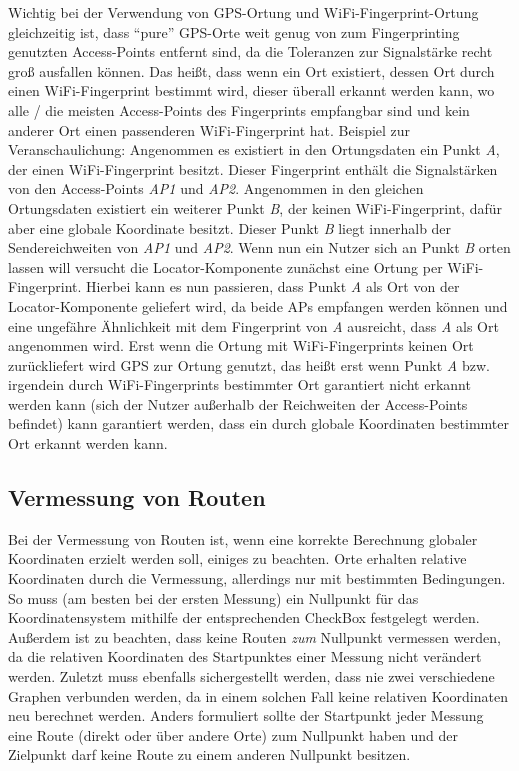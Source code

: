 Wichtig bei der Verwendung von GPS-Ortung und WiFi-Fingerprint-Ortung gleichzeitig ist, dass \enquote{pure} GPS-Orte weit genug von zum Fingerprinting genutzten Access-Points entfernt sind, da die Toleranzen zur Signalstärke recht groß ausfallen können. Das heißt, dass wenn ein Ort existiert, dessen Ort durch einen WiFi-Fingerprint bestimmt wird, dieser überall erkannt werden kann, wo alle / die meisten Access-Points des Fingerprints empfangbar sind und kein anderer Ort einen passenderen WiFi-Fingerprint hat. Beispiel zur Veranschaulichung: Angenommen es existiert in den Ortungsdaten ein Punkt \textit{A}, der einen WiFi-Fingerprint besitzt. Dieser Fingerprint enthält die Signalstärken von den Access-Points \textit{AP1} und \textit{AP2}. Angenommen in den gleichen Ortungsdaten existiert ein weiterer Punkt \textit{B}, der keinen WiFi-Fingerprint, dafür aber eine globale Koordinate besitzt. Dieser Punkt \textit{B} liegt innerhalb der Sendereichweiten von \textit{AP1} und \textit{AP2}. Wenn nun ein Nutzer sich an Punkt \textit{B} orten lassen will versucht die Locator-Komponente zunächst eine Ortung per WiFi-Fingerprint. Hierbei kann es nun passieren, dass Punkt \textit{A} als Ort von der Locator-Komponente geliefert wird, da beide APs empfangen werden können und eine ungefähre Ähnlichkeit mit dem Fingerprint von \textit{A} ausreicht, dass \textit{A} als Ort angenommen wird. Erst wenn die Ortung mit WiFi-Fingerprints keinen Ort zurückliefert wird GPS zur Ortung genutzt, das heißt erst wenn Punkt \textit{A} bzw. irgendein durch WiFi-Fingerprints bestimmter Ort garantiert nicht erkannt werden kann (sich der Nutzer außerhalb der Reichweiten der Access-Points befindet) kann garantiert werden, dass ein durch globale Koordinaten bestimmter Ort erkannt werden kann.

\subsection{Vermessung von Routen}
Bei der Vermessung von Routen ist, wenn eine korrekte Berechnung globaler Koordinaten erzielt werden soll, einiges zu beachten. Orte erhalten relative Koordinaten durch die Vermessung, allerdings nur mit bestimmten Bedingungen. So muss (am besten bei der ersten Messung) ein Nullpunkt für das Koordinatensystem mithilfe der entsprechenden CheckBox festgelegt werden. Außerdem ist zu beachten, dass keine Routen \textit{zum} Nullpunkt vermessen werden, da die relativen Koordinaten des Startpunktes einer Messung nicht verändert werden. Zuletzt muss ebenfalls sichergestellt werden, dass nie zwei verschiedene Graphen verbunden werden, da in einem solchen Fall keine relativen Koordinaten neu berechnet werden. Anders formuliert sollte der Startpunkt jeder Messung eine Route (direkt oder über andere Orte) zum Nullpunkt haben und der Zielpunkt darf keine Route zu einem anderen Nullpunkt besitzen.

